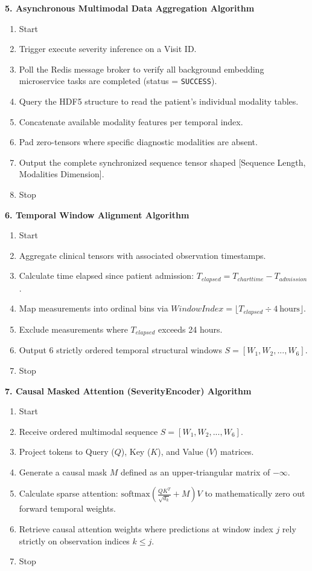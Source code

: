 \documentclass{fisatprojectfinal}
\begin{document}
\textbf{5. Asynchronous Multimodal Data Aggregation Algorithm}
\begin{enumerate}
    \item Start
    \item Trigger execute severity inference on a Visit ID.
    \item Poll the Redis message broker to verify all background embedding microservice tasks are completed (status = \texttt{SUCCESS}).
    \item Query the HDF5 structure to read the patient's individual modality tables.
    \item Concatenate available modality features per temporal index.
    \item Pad zero-tensors where specific diagnostic modalities are absent.
    \item Output the complete synchronized sequence tensor shaped [Sequence Length, Modalities Dimension].
    \item Stop
\end{enumerate}

\textbf{6. Temporal Window Alignment Algorithm}
\begin{enumerate}
    \item Start
    \item Aggregate clinical tensors with associated observation timestamps.
    \item Calculate time elapsed since patient admission: $T_{elapsed} = T_{charttime} - T_{admission}$.
    \item Map measurements into ordinal bins via $WindowIndex = \lfloor T_{elapsed} \div 4 \ \text{hours} \rfloor$.
    \item Exclude measurements where $T_{elapsed}$ exceeds 24 hours.
    \item Output 6 strictly ordered temporal structural windows $S = [W_1, W_2, ..., W_6]$.
    \item Stop
\end{enumerate}

\textbf{7. Causal Masked Attention (SeverityEncoder) Algorithm}
\begin{enumerate}
    \item Start
    \item Receive ordered multimodal sequence $S = [W_1, W_2, ..., W_6]$.
    \item Project tokens to Query ($Q$), Key ($K$), and Value ($V$) matrices.
    \item Generate a causal mask $M$ defined as an upper-triangular matrix of $-\infty$.
    \item Calculate sparse attention: $\text{softmax}(\frac{QK^T}{\sqrt{d_k}} + M)V$ to mathematically zero out forward temporal weights.
    \item Retrieve causal attention weights where predictions at window index $j$ rely strictly on observation indices $k \leq j$.
    \item Stop
\end{enumerate}
\end{document}
